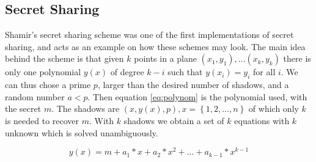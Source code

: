 \subsection{Secret Sharing}\label{sec:secret_sharing}
 Shamir's secret sharing scheme \cite{shamir_share} was one of the first implementations of secret sharing, and acts as an example on how these schemes may look. The main idea behind the scheme is that given $k$ points in a plane $(x_1,y_1), ... (x_k,y_k)$ there is only one polynomial $y(x)$ of degree $k-i$ such that $y(x_i) = y_i$ for all $i$. We can thus chose a prime $p$, larger than the desired number of shadows, and a random number $a < p$. Then equation \ref{eq:polynom} is the polynomial used, with the secret $m$. The shadows are $(x, y(x), p) , x=\left\{ {1,2, ... ,n}\right\}$ of which only $k$ is needed to recover $m$. With $k$ shadows we obtain a set of $k$ equations with $k$ unknown which is solved unambiguously.

\begin{equation}
 y(x) = m + a_1*x + a_2*x^2 + ... + a_{k-1} * x^{k-1} 
\end{equation}\label{eq:polynom}



